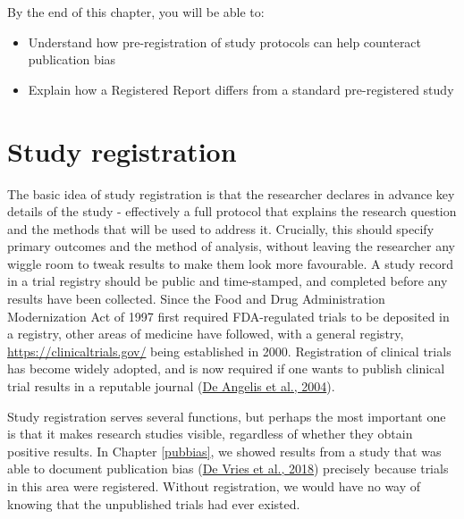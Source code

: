 \documentclass{krantz}
\begin{document}
By the end of this chapter, you will be able to:

\begin{itemize}
\item
  Understand how pre-registration of study protocols can help counteract publication bias
\item
  Explain how a Registered Report differs from a standard pre-registered study
\end{itemize}

\hypertarget{study-registration}{%
\section{Study registration}\label{study-registration}}

The basic idea of study registration is that the researcher declares in advance key details of the study - effectively a full protocol that explains the research question and the methods that will be used to address it. Crucially, this should specify primary outcomes and the method of analysis, without leaving the researcher any wiggle room to tweak results to make them look more favourable. A study record in a trial registry should be public and time-stamped, and completed before any results have been collected. Since the Food and Drug Administration Modernization Act of 1997 first required FDA-regulated trials to be deposited in a registry, other areas of medicine have followed, with a general registry, \url{https://clinicaltrials.gov/} being established in 2000. Registration of clinical trials has become widely adopted, and is now required if one wants to publish clinical trial results in a reputable journal (\protect\hyperlink{ref-deangelis2004}{De Angelis et al., 2004}).

Study registration serves several functions, but perhaps the most important one is that it makes research studies visible, regardless of whether they obtain positive results. In Chapter \ref{pubbias}, we showed results from a study that was able to document publication bias (\protect\hyperlink{ref-devries2018}{De Vries et al., 2018}) precisely because trials in this area were registered. Without registration, we would have no way of knowing that the unpublished trials had ever existed.
\end{document}
